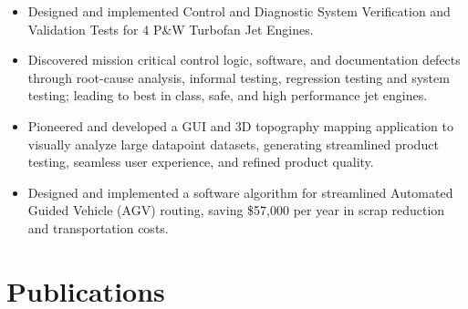 \documentclass[11pt,a4paper,sans]{moderncv} %
\begin{document}

{
\begin{itemize}
	\item Designed and implemented Control and Diagnostic System Verification and Validation Tests for 4 P\&W Turbofan Jet Engines. 
	\item Discovered mission critical control logic, software, and documentation defects through root-cause analysis, informal testing, regression testing and system testing; leading to best in class, safe, and high performance jet engines.
\end{itemize}
}


{
\begin{itemize}
	\item Pioneered and developed a GUI and 3D topography mapping application to visually analyze large datapoint datasets, generating streamlined product testing, seamless user experience, and refined product quality.
\end{itemize}
}

{
\begin{itemize}
	\item Designed and implemented a software algorithm for streamlined Automated Guided Vehicle (AGV) routing, saving \$57,000 per year in scrap reduction and transportation costs.
\end{itemize}
}

\section{Publications}

\begin{refsection}[conference]
	\nocite{*}
	\printbibliography[title={Conferences},heading=subbibliography]
\end{refsection}
\begin{refsection}[journal]
	\nocite{*}
	\printbibliography[title={Journals},heading=subbibliography]
\end{refsection}
\begin{refsection}[workshop]
	\nocite{*}
	\printbibliography[title={Workshops},heading=subbibliography]
\end{refsection}
\end{document}
